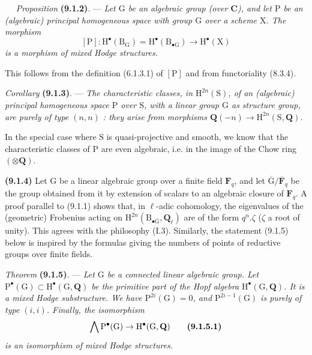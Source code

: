 \documentclass[11pt,leqno]{article}
\newcommand{\Page}[1]{\ifvmode\noindent\else\unskip\ \fi{\footnotesize\textcolor{gray}{[p.\,#1]}}\ \ignorespaces}
\begin{document}
\Page{46}
\textit{Proposition} \textbf{(9.1.2)}. — \textit{Let \(\mathrm{G}\) be an algebraic group (over \(\mathbf{C}\)), and let \(\mathrm{P}\) be an (algebraic) principal homogeneous space with group \(\mathrm{G}\) over a scheme \(\mathrm{X}\). The morphism}
\[
[\mathrm{P}]:\mathrm{H}^{\bullet}(\mathrm{B}_{\mathrm{G}})
=\mathrm{H}^{\bullet}(\mathrm{B}_{\bullet\mathrm{G}})
\to\mathrm{H}^{\bullet}(\mathrm{X})
\]
\textit{is a morphism of mixed Hodge structures.}

This follows from the definition (6.1.3.1) of \([\mathrm{P}]\) and from functoriality (8.3.4).

\textit{Corollary} \textbf{(9.1.3)}. — \textit{The characteristic classes, in \(\mathrm{H}^{2n}(\mathrm{S})\), of an (algebraic) principal homogeneous space \(\mathrm{P}\) over \(\mathrm{S}\), with a linear group \(\mathrm{G}\) as structure group, are purely of type \((n,n)\) : they arise from morphisms \(\mathbf{Q}(-n)\to\mathrm{H}^{2n}(\mathrm{S},\mathbf{Q})\).}

In the special case where \(\mathrm{S}\) is quasi-projective and smooth, we know that the characteristic classes of \(\mathrm{P}\) are even algebraic, i.e. in the image of the Chow ring \((\otimes\mathbf{Q})\).

\textbf{(9.1.4)} Let \(\mathrm{G}\) be a linear algebraic group over a finite field \(\mathbf{F}_{q}\), and let \(\overline{\mathrm{G}}/\overline{\mathbf{F}}_{q}\) be the group obtained from it by extension of scalars to an algebraic closure of \(\mathbf{F}_{q}\). A proof parallel to (9.1.1) shows that, in \(\ell\)-adic cohomology, the eigenvalues of the (geometric) Frobenius acting on \(\mathrm{H}^{2n}(\mathrm{B}_{\bullet\overline{\mathrm{G}}},\mathbf{Q}_{\ell})\) are of the form \(q^{n}.\zeta\) (\(\zeta\) a root of unity). This agrees with the philosophy (I.3). Similarly, the statement (9.1.5) below is inspired by the formulas giving the numbers of points of reductive groups over finite fields.

\textit{Theorem} \textbf{(9.1.5)}. — \textit{Let \(\mathrm{G}\) be a connected linear algebraic group. Let \(\mathrm{P}^{\bullet}(\mathrm{G})\subset\mathrm{H}^{\bullet}(\mathrm{G},\mathbf{Q})\) be the primitive part of the Hopf algebra \(\mathrm{H}^{\bullet}(\mathrm{G},\mathbf{Q})\). It is a mixed Hodge substructure. We have \(\mathrm{P}^{2i}(\mathrm{G})=0\), and \(\mathrm{P}^{2i-1}(\mathrm{G})\) is purely of type \((i,i)\). Finally, the isomorphism}
\[
\bigwedge\mathrm{P}^{\bullet}(\mathrm{G})
\to\mathrm{H}^{\bullet}(\mathrm{G},\mathbf{Q})
\tag*{\textbf{(9.1.5.1)}}
\]
\textit{is an isomorphism of mixed Hodge structures.}
\end{document}
